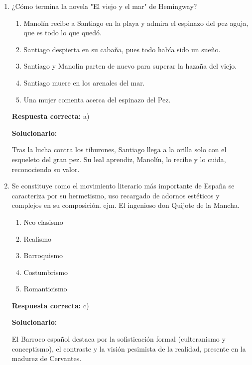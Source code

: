 \begin{enumerate}[resume]
	\item ¿Cómo termina la novela "El viejo y el mar" de Hemingway?
	\begin{enumerate}[label=\alph*)]
		\item Manolín recibe a Santiago en la playa y admira el espinazo del pez aguja, que es todo lo que quedó.
		\item Santiago despierta en su cabaña, pues todo había sido un sueño.
		\item Santiago y Manolín parten de nuevo para superar la hazaña del viejo.
		\item Santiago muere en los arenales del mar.
		\item Una mujer comenta acerca del espinazo del Pez.
	\end{enumerate}
	\textbf{Respuesta correcta:} a)

	\vspace{2mm}
	\textbf{Solucionario:}

	Tras la lucha contra los tiburones, Santiago llega a la orilla solo con el esqueleto del gran pez. Su leal aprendiz, Manolín, lo recibe y lo cuida, reconociendo su valor.

	\vspace{6mm}

	\item Se constituye como el movimiento literario más importante de España se caracteriza por su hermetismo, uso recargado de adornos estéticos y complejos en su composición. ejm. El ingenioso don Quijote de la Mancha.
	\begin{enumerate}[label=\alph*)]
		\item Neo clasismo
		\item Realismo
		\item Barroquismo
		\item Costumbrismo
		\item Romanticismo
	\end{enumerate}
	\textbf{Respuesta correcta:} c)

	\vspace{2mm}
	\textbf{Solucionario:}

	El Barroco español destaca por la sofisticación formal (culteranismo y conceptismo), el contraste y la visión pesimista de la realidad, presente en la madurez de Cervantes.

	\vspace{6mm}


\end{enumerate}
